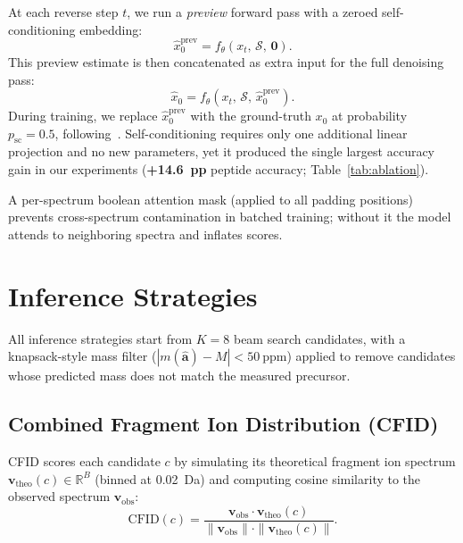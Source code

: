 \documentclass{article}
\newcommand{\vect}[1]{\mathbf{#1}}
\newcommand{\R}{\mathbb{R}}
\begin{document}
At each reverse step $t$, we run a \emph{preview} forward pass with a zeroed self-conditioning embedding:
\begin{equation}
  \hat{x}_0^{\text{prev}} = f_\theta\!\left(x_t,\, \mathcal{S},\, \vect{0}\right).
\end{equation}
This preview estimate is then concatenated as extra input for the full denoising pass:
\begin{equation}
  \hat{x}_0 = f_\theta\!\left(x_t,\, \mathcal{S},\, \hat{x}_0^{\text{prev}}\right).
  \label{eq:selfcond}
\end{equation}
During training, we replace $\hat{x}_0^{\text{prev}}$ with the ground-truth $x_0$ at probability
$p_{\text{sc}} = 0.5$, following~\citet{chen2022analog}.
Self-conditioning requires only one additional linear projection and no new parameters, yet it
produced the single largest accuracy gain in our experiments
(\textbf{+14.6~pp} peptide accuracy; Table~\ref{tab:ablation}).

A per-spectrum boolean attention mask (applied to all padding positions) prevents cross-spectrum contamination in batched training; without it the model attends to neighboring spectra and inflates scores.

\section{Inference Strategies}
\label{sec:inference}

All inference strategies start from $K\!=\!8$ beam search candidates, with a knapsack-style
mass filter ($|m(\hat{\vect{a}}) - M| < 50~\text{ppm}$) applied to remove candidates whose
predicted mass does not match the measured precursor.

\subsection{Combined Fragment Ion Distribution (CFID)}

CFID scores each candidate $c$ by simulating its theoretical fragment ion spectrum
$\vect{v}_{\text{theo}}(c) \in \R^B$ (binned at 0.02~Da) and computing cosine similarity to
the observed spectrum $\vect{v}_{\text{obs}}$:
\begin{equation}
  \text{CFID}(c) = \frac{\vect{v}_{\text{obs}} \cdot \vect{v}_{\text{theo}}(c)}
                        {\|\vect{v}_{\text{obs}}\| \cdot \|\vect{v}_{\text{theo}}(c)\|}.
  \label{eq:cfid}
\end{equation}
\end{document}
